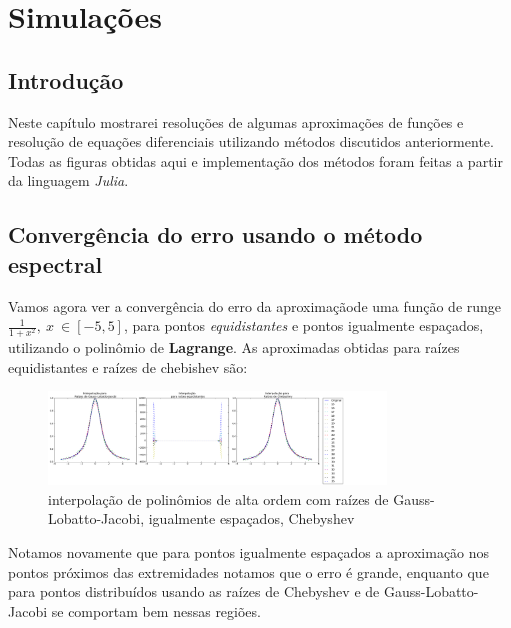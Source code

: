\chapter{Simulações}
\label{cap:III}
\section{Introdução}
 Neste capítulo mostrarei resoluções de algumas aproximações de funções e resolução de equações diferenciais utilizando métodos discutidos anteriormente. Todas as figuras obtidas aqui e implementação dos métodos foram feitas a partir da linguagem \emph{Julia}.

\section{Convergência do erro usando o método espectral}
	Vamos agora ver a convergência do erro da aproximaçãode uma função de runge $\frac{1}{1+x^2},\ x\ \in [-5,5]$, para pontos \emph{equidistantes} e pontos igualmente espaçados, utilizando o polinômio de \textbf{Lagrange}.
	As aproximadas obtidas para raízes equidistantes e raízes de chebishev são:\\	
\begin{figure}[!ht]
  \includegraphics[width=0.8\textwidth,center]{figuras/interpolacao_todas.png}
  \caption{interpolação de polinômios de alta ordem com raízes de Gauss-Lobatto-Jacobi, igualmente espaçados, Chebyshev}
\end{figure}
Notamos novamente que para pontos igualmente espaçados a aproximação nos pontos próximos das extremidades notamos que o erro é grande, enquanto que para pontos distribuídos usando as raízes de Chebyshev e de Gauss-Lobatto-Jacobi se comportam bem nessas regiões.



